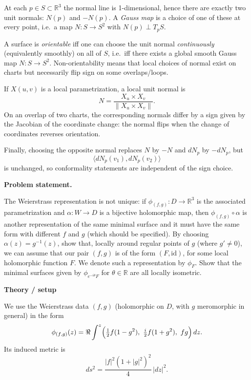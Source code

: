 \begin{solution}
	At each $p\in S\subset\mathbb{R}^3$ the normal line is 1-dimensional, hence there are exactly two unit normals:
	$N(p)$ and $-N(p)$. A \emph{Gauss map} is a choice of one of these at every point,
	i.e.\ a map $N:S\to S^2$ with $N(p)\perp T_pS$.
	
	A surface is \emph{orientable} iff one can choose the unit normal \emph{continuously} (equivalently smoothly) on all of $S$,
	i.e.\ iff there exists a global smooth Gauss map $N:S\to S^2$.
	Non-orientability means that local choices of normal exist on charts but necessarily flip sign on some overlaps/loops.
	
	If $X(u,v)$ is a local parametrization, a local unit normal is
	\[
	N=\frac{X_u\times X_v}{\|X_u\times X_v\|}.
	\]
	On an overlap of two charts, the corresponding normals differ by a sign given by the Jacobian of the coordinate change:
	the normal flips when the change of coordinates reverses orientation.
	
	Finally, choosing the opposite normal replaces $N$ by $-N$ and $dN_p$ by $-dN_p$, but
	\[
	\langle dN_p(v_1),dN_p(v_2)\rangle
	\]
	is unchanged, so conformality statements are independent of the sign choice.
\end{solution}

\begin{problem}
\label{prob:cp-vii-0056}
\par\medskip\noindent\textbf{\textbf{Problem statement.}}\par\smallskip

The Weierstrass representation is not unique: if $\phi_{(f,g)}:D\to\mathbb{R}^3$ is the associated parametrization and
$\alpha:W\to D$ is a bijective holomorphic map, then $\phi_{(f,g)}\circ\alpha$ is another representation of the same minimal
surface and it must have the same form with different $f$ and $g$ (which should be specified).
By choosing $\alpha(z)=g^{-1}(z)$, show that, locally around regular points of $g$ (where $g'\neq 0$), we can assume
that our pair $(f,g)$ is of the form $(F,\mathrm{id})$, for some local holomorphic function $F$. We denote such a
representation by $\phi_F$. Show that the minimal surfaces given by $\phi_{e^{-i\theta}F}$ for $\theta\in\mathbb{R}$
are all locally isometric.

\medskip

\par\medskip\noindent\textbf{Theory / setup}\par\smallskip

We use the Weierstrass data $(f,g)$ (holomorphic on $D$, with $g$ meromorphic in general) in the form
\[
\phi_{(f,g)}(z)
=
\Re\int^z
\Bigl(\tfrac12 f(1-g^2),\ \tfrac{i}{2}f(1+g^2),\ fg\Bigr)\,dz.
\]
Its induced metric is
\[
ds^2
=
\frac{|f|^2(1+|g|^2)^2}{4}\,|dz|^2.
\]

\medskip
\end{problem}

